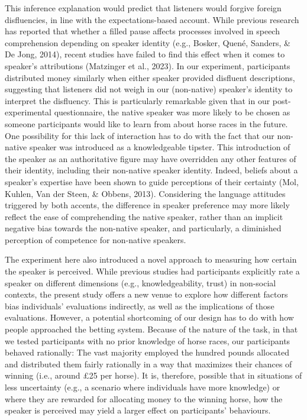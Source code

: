 \documentclass[
  man,floatsintext]{apa7}
\begin{document}
This inference explanation would predict that listeners would forgive foreign disfluencies, in line with the expectations-based account. While previous research has reported that whether a filled pause affects processes involved in speech comprehension depending on speaker identity (e.g., Bosker, Quené, Sanders, \& De Jong, 2014), recent studies have failed to find this effect when it comes to speaker's attributions (Matzinger et al., 2023). In our experiment, participants distributed money similarly when either speaker provided disfluent descriptions, suggesting that listeners did not weigh in our (non-native) speaker's identity to interpret the disfluency. This is particularly remarkable given that in our post-experimental questionnaire, the native speaker was more likely to be chosen as someone participants would like to learn from about horse races in the future. One possibility for this lack of interaction has to do with the fact that our non-native speaker was introduced as a knowledgeable tipster. This introduction of the speaker as an authoritative figure may have overridden any other features of their identity, including their non-native speaker identity. Indeed, beliefs about a speaker's expertise have been shown to guide perceptions of their certainty (Mol, Kuhlen, Van der Steen, \& Obbens, 2013). Considering the language attitudes triggered by both accents, the difference in speaker preference may more likely reflect the ease of comprehending the native speaker, rather than an implicit negative bias towards the non-native speaker, and particularly, a diminished perception of competence for non-native speakers.

The experiment here also introduced a novel approach to measuring how certain the speaker is perceived. While previous studies had participants explicitly rate a speaker on different dimensions (e.g., knowledgeability, trust) in non-social contexts, the present study offers a new venue to explore how different factors bias individuals' evaluations indirectly, as well as the implications of those evaluations. However, a potential shortcoming of our design has to do with how people approached the betting system. Because of the nature of the task, in that we tested participants with no prior knowledge of horse races, our participants behaved rationally: The vast majority employed the hundred pounds allocated and distributed them fairly rationally in a way that maximizes their chances of winning (i.e., around £25 per horse). It is, therefore, possible that in situations of less uncertainty (e.g., a scenario where individuals have more knowledge) or where they are rewarded for allocating money to the winning horse, how the speaker is perceived may yield a larger effect on participants' behaviours.
\end{document}
